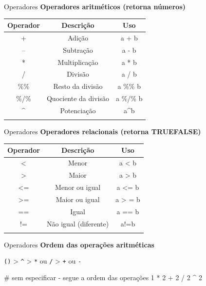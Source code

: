 \documentclass[
  ignorenonframetext,
]{beamer}
\newenvironment{Shaded}{\begin{snugshade}}{\end{snugshade}}
\newcommand{\CommentTok}[1]{\textcolor[rgb]{0.37,0.37,0.37}{#1}}
\newcommand{\DecValTok}[1]{\textcolor[rgb]{0.68,0.00,0.00}{#1}}
\newcommand{\SpecialCharTok}[1]{\textcolor[rgb]{0.37,0.37,0.37}{#1}}
\begin{document}
\begin{frame}[fragile]{}
\protect\hypertarget{section-1}{}
\begin{block}{Operadores}
\protect\hypertarget{operadores}{}
\textbf{Operadores aritméticos (retorna números)}

\begin{longtable}[]{@{}ccc@{}}
\toprule\noalign{}
Operador & Descrição & Uso \\
\midrule\noalign{}
\endhead
+ & Adição & a + b \\
-- & Subtração & a - b \\
* & Multiplicação & a * b \\
/ & Divisão & a / b \\
\%\% & Resto da divisão & a \%\% b \\
\%/\% & Quociente da divisão & a \%/\% b \\
\^{} & Potenciação & a\^{}b \\
\bottomrule\noalign{}
\end{longtable}
\end{block}

\begin{block}{Operadores}
\protect\hypertarget{operadores-1}{}
\textbf{Operadores relacionais (retorna TRUE\textbar FALSE)}

\begin{longtable}[]{@{}ccc@{}}
\toprule\noalign{}
Operador & Descrição & Uso \\
\midrule\noalign{}
\endhead
\textless{} & Menor & a \textless{} b \\
\textgreater{} & Maior & a \textgreater{} b \\
\textless= & Menor ou igual & a \textless= b \\
\textgreater= & Maior ou igual & a \textgreater{} = b \\
== & Igual & a == b \\
!= & Não igual (diferente) & a!=b \\
\bottomrule\noalign{}
\end{longtable}
\end{block}

\begin{block}{Operadores}
\protect\hypertarget{operadores-2}{}
\textbf{Ordem das operações aritméticas}

\texttt{()} \textgreater{} \texttt{\^{}} \textgreater{} \texttt{*} ou
\texttt{/} \textgreater{} \texttt{+} ou \texttt{-}

\begin{Shaded}
\begin{Highlighting}[]
\CommentTok{\# sem especificar {-} segue a ordem das operações}
\DecValTok{1} \SpecialCharTok{*} \DecValTok{2} \SpecialCharTok{+} \DecValTok{2} \SpecialCharTok{/} \DecValTok{2} \SpecialCharTok{\^{}} \DecValTok{2}
\end{Highlighting}
\end{Shaded}


\end{block}
\end{frame}
\end{document}
